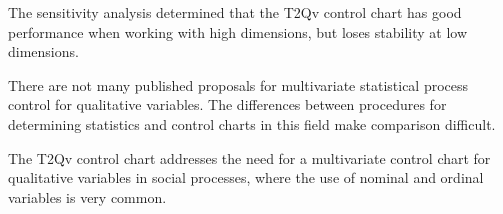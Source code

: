 \documentclass[mathematics,article,submit,moreauthors,pdftex]{mdpi}
\begin{document}
The sensitivity analysis determined that the T2Qv control chart has good
performance when working with high dimensions, but loses stability at
low dimensions.

There are not many published proposals for multivariate statistical
process control for qualitative variables. The differences between
procedures for determining statistics and control charts in this field
make comparison difficult.

The T2Qv control chart addresses the need for a multivariate control
chart for qualitative variables in social processes, where the use of
nominal and ordinal variables is very common.

%

\vspace{6pt}








\end{document}

